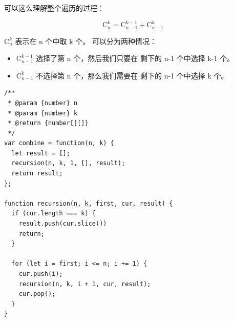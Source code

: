 可以这么理解整个遍历的过程：

\begin{displaymath}
  \mathrm{C}_n^k = \mathrm{C}_{n-1}^{k-1} + \mathrm{C}_{n-1}^k
\end{displaymath}

$\mathrm{C}_n^k$ 表示在 n 个中取 k 个。
可以分为两种情况：

\begin{itemize}
  \item $\mathrm{C}_{n-1}^{k-1}$ 选择了第 n 个，然后我们只要在
    剩下的 n-1 个中选择 k-1 个。
  \item $\mathrm{C}_{n-1}^k$ 不选择第 n 个，那么我们需要在
    剩下的 n-1 个中选择 k 个。
\end{itemize}

\begin{verbatim}
/**
 * @param {number} n
 * @param {number} k
 * @return {number[][]}
 */
var combine = function(n, k) {
  let result = [];
  recursion(n, k, 1, [], result);
  return result;
};

function recursion(n, k, first, cur, result) {
  if (cur.length === k) {
    result.push(cur.slice())
    return;
  }

  for (let i = first; i <= n; i += 1) {
    cur.push(i);
    recursion(n, k, i + 1, cur, result);
    cur.pop();
  }
}
\end{verbatim}
